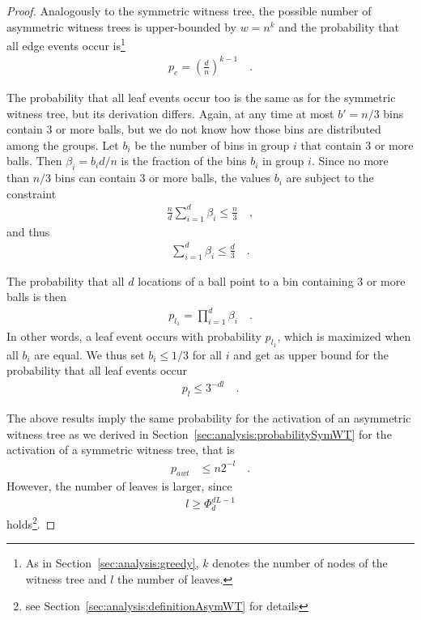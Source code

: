 \documentclass[a4paper,12pt]{article}
\begin{document}
\begin{proof}
Analogously to the symmetric witness tree, the possible number of asymmetric witness trees is upper-bounded by $w=n^k$ and the probability that all edge events occur is\footnote{As in Section~\ref{sec:analysis:greedy}, $k$ denotes the number of nodes of the witness tree and $l$ the number of leaves.} 
\begin{align*}
p_e = \left(\frac{d}{n}\right)^{k-1}\quad .
\end{align*}

The probability that all leaf events occur too is the same as for the symmetric witness tree, but its derivation differs. Again, at any time at most $b'=n/3$ bins contain 3 or more balls, but we do not know how those bins are distributed among the groups. Let $b_i$ be the number of bins in group $i$ that contain 3 or more balls. Then $\beta_i = b_i d/ n$ is the fraction of the bins $b_i$ in group $i$. Since no more than $n/3$ bins can contain 3 or more balls, the values $b_i$ are subject to the constraint
\begin{align*}
\frac{n}{d}\sum_{i=1}^d \beta_i \leq \frac{n}{3}\quad ,
\end{align*}
and thus 
\begin{align*}
\sum_{i=1}^d \beta_i \leq \frac{d}{3}\quad .
\end{align*}

The probability that all $d$ locations of a ball point to a bin containing 3 or more balls is then 
\begin{align*}
p_{l_1} = \prod_{i=1}^{d} \beta_i \quad .
\end{align*}
In other words, a leaf event occurs with probability $p_{l_1}$, which is maximized when all $b_i$ are equal. We thus set $b_i \leq 1/3$ for all $i$ and get as upper bound for the probability that all leaf events occur 
\begin{align*}
p_l \leq 3^{-d l}\quad .
\end{align*}

The above results imply the same probability for the activation of an asymmetric witness tree as we derived in Section~\ref{sec:analysis:probabilitySymWT} for the activation of a symmetric witness tree, that is
\begin{align*}
p_{awt} &\leq n  2^{-l}\quad .
\end{align*}
However, the number of leaves is larger, since 
\begin{align*}
l \geq \Phi_d^{d L -1}
\end{align*}
holds\footnote{see Section~\ref{sec:analysis:definitionAsymWT} for details}.


\end{proof}
\end{document}
